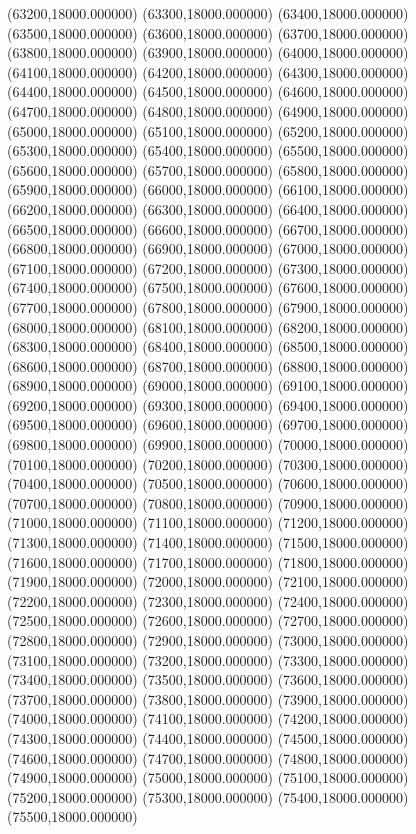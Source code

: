 (63200,18000.000000)
(63300,18000.000000)
(63400,18000.000000)
(63500,18000.000000)
(63600,18000.000000)
(63700,18000.000000)
(63800,18000.000000)
(63900,18000.000000)
(64000,18000.000000)
(64100,18000.000000)
(64200,18000.000000)
(64300,18000.000000)
(64400,18000.000000)
(64500,18000.000000)
(64600,18000.000000)
(64700,18000.000000)
(64800,18000.000000)
(64900,18000.000000)
(65000,18000.000000)
(65100,18000.000000)
(65200,18000.000000)
(65300,18000.000000)
(65400,18000.000000)
(65500,18000.000000)
(65600,18000.000000)
(65700,18000.000000)
(65800,18000.000000)
(65900,18000.000000)
(66000,18000.000000)
(66100,18000.000000)
(66200,18000.000000)
(66300,18000.000000)
(66400,18000.000000)
(66500,18000.000000)
(66600,18000.000000)
(66700,18000.000000)
(66800,18000.000000)
(66900,18000.000000)
(67000,18000.000000)
(67100,18000.000000)
(67200,18000.000000)
(67300,18000.000000)
(67400,18000.000000)
(67500,18000.000000)
(67600,18000.000000)
(67700,18000.000000)
(67800,18000.000000)
(67900,18000.000000)
(68000,18000.000000)
(68100,18000.000000)
(68200,18000.000000)
(68300,18000.000000)
(68400,18000.000000)
(68500,18000.000000)
(68600,18000.000000)
(68700,18000.000000)
(68800,18000.000000)
(68900,18000.000000)
(69000,18000.000000)
(69100,18000.000000)
(69200,18000.000000)
(69300,18000.000000)
(69400,18000.000000)
(69500,18000.000000)
(69600,18000.000000)
(69700,18000.000000)
(69800,18000.000000)
(69900,18000.000000)
(70000,18000.000000)
(70100,18000.000000)
(70200,18000.000000)
(70300,18000.000000)
(70400,18000.000000)
(70500,18000.000000)
(70600,18000.000000)
(70700,18000.000000)
(70800,18000.000000)
(70900,18000.000000)
(71000,18000.000000)
(71100,18000.000000)
(71200,18000.000000)
(71300,18000.000000)
(71400,18000.000000)
(71500,18000.000000)
(71600,18000.000000)
(71700,18000.000000)
(71800,18000.000000)
(71900,18000.000000)
(72000,18000.000000)
(72100,18000.000000)
(72200,18000.000000)
(72300,18000.000000)
(72400,18000.000000)
(72500,18000.000000)
(72600,18000.000000)
(72700,18000.000000)
(72800,18000.000000)
(72900,18000.000000)
(73000,18000.000000)
(73100,18000.000000)
(73200,18000.000000)
(73300,18000.000000)
(73400,18000.000000)
(73500,18000.000000)
(73600,18000.000000)
(73700,18000.000000)
(73800,18000.000000)
(73900,18000.000000)
(74000,18000.000000)
(74100,18000.000000)
(74200,18000.000000)
(74300,18000.000000)
(74400,18000.000000)
(74500,18000.000000)
(74600,18000.000000)
(74700,18000.000000)
(74800,18000.000000)
(74900,18000.000000)
(75000,18000.000000)
(75100,18000.000000)
(75200,18000.000000)
(75300,18000.000000)
(75400,18000.000000)
(75500,18000.000000)
